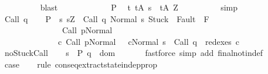 \begin{isabellebody}
\ \ \ \ \ \ \ \ \isamarkupfalse%
\ blast\isanewline
\ \ \ \ \isamarkupfalse%
\isanewline
\ \ \ \ \ \ \isamarkupfalse%
\ P\ \isamarkupfalse%
\ {\isachardoublequoteopen}{\isasymforall}t{\isachardot}\ t{\isasymin}{\isacharquery}A\ s\ {\isasymlongrightarrow}\ t{\isasymin}{\isacharquery}A\ Z{\isachardoublequoteclose}\isanewline
\ \ \ \ \ \ \ \ \isamarkupfalse%
\ simp\isanewline
\ \ \ \ \isamarkupfalse%
\isanewline
\ \ \isamarkupfalse%
\isanewline
{}\isamarkupfalse%
\isanewline
\ \ \isamarkupfalse%
\ {\isacharparenleft}Call\ q{\isacharparenright}\isanewline
\ \ \isamarkupfalse%
\ {\isacharquery}P\ {\isacharequal}\ {\isachardoublequoteopen}{\isacharbraceleft}s{\isachardot}\ s{\isacharequal}Z\ {\isasymand}\ {\isasymGamma}{\isasymturnstile}{\isasymlangle}Call\ q\ {\isacharcomma}Normal\ s{\isasymrangle}\ {\isasymRightarrow}{\isasymnotin}{\isacharparenleft}{\isacharbraceleft}Stuck{\isacharbraceright}\ {\isasymunion}\ Fault\ {\isacharbackquote}\ {\isacharparenleft}{\isacharminus}F{\isacharparenright}{\isacharparenright}\ {\isasymand}\isanewline
\ \ \ \ \ \ \ \ \ \ \ \ \ \ \ {\isasymGamma}{\isasymturnstile}Call\ p{\isasymdown}Normal\ {\isasymsigma}\ {\isasymand}\isanewline
\ \ \ \ \ \ \ \ \ \ \ \ \ \ {\isacharparenleft}{\isasymexists}c{\isacharprime}{\isachardot}\ {\isasymGamma}{\isasymturnstile}{\isacharparenleft}Call\ p{\isacharcomma}Normal\ {\isasymsigma}{\isacharparenright}\ {\isasymrightarrow}\isactrlsup {\isacharplus}\ {\isacharparenleft}c{\isacharprime}{\isacharcomma}Normal\ s{\isacharparenright}\ {\isasymand}\ Call\ q\ {\isasymin}\ redexes\ c{\isacharprime}{\isacharparenright}{\isacharbraceright}{\isachardoublequoteclose}\isanewline
\ \ \isamarkupfalse%
\ noStuck{\isacharunderscore}Call\isanewline
\ \ \isamarkupfalse%
\ {\isachardoublequoteopen}{\isasymforall}s\ {\isasymin}\ {\isacharquery}P{\isachardot}\ q\ {\isasymin}\ dom\ {\isasymGamma}{\isachardoublequoteclose}\isanewline
\ \ \ \ \isamarkupfalse%
\ {\isacharparenleft}fastforce\ simp\ add{\isacharcolon}\ final{\isacharunderscore}notin{\isacharunderscore}def{\isacharparenright}\isanewline
\ \ \isamarkupfalse%
\ \isamarkupfalse%
\ {\isacharquery}case\isanewline
\ \ \isamarkupfalse%
\ {\isacharparenleft}rule\ conseq{\isacharunderscore}extract{\isacharunderscore}state{\isacharunderscore}indep{\isacharunderscore}prop{\isacharparenright}\isanewline
\ \ \ \ \isamarkupfalse%

\end{isabellebody}
